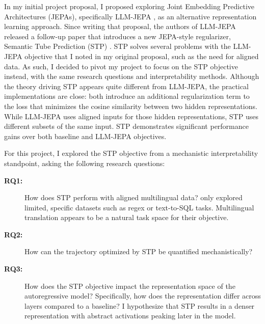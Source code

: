 \documentclass[11pt]{article}
\begin{document}
In my initial project proposal, I proposed exploring Joint Embedding Predictive Architectures (JEPAs), specifically LLM-JEPA \cite{huang2026llmjepa}, as an alternative representation learning approach. Since writing that proposal, the authors of LLM-JEPA released a follow-up paper that introduces a new JEPA-style regularizer, Semantic Tube Prediction (STP) \cite{stp}. STP solves several problems with the LLM-JEPA objective that I noted in my original proposal, such as the need for aligned data. As such, I decided to pivot my project to focus on the STP objective instead, with the same research questions and interpretability methods. Although the theory driving STP appears quite different from LLM-JEPA, the practical implementations are close: both introduce an additional regularization term to the loss that minimizes the cosine similarity between two hidden representations. While LLM-JEPA uses aligned inputs for those hidden representations, STP uses different subsets of the same input. STP demonstrates significant performance gains over both baseline and LLM-JEPA objectives.



For this project, I explored the STP objective from a mechanistic interpretability standpoint, asking the following research questions:

\begin{description}
  \item[\textbf{RQ1:}] How does STP perform with aligned multilingual data? \citet{stp} only explored limited, specific datasets such as regex or text-to-SQL tasks. Multilingual translation appears to be a natural task space for their objective.
  \item[\textbf{RQ2:}] How can the trajectory optimized by STP be quantified mechanistically? 
  \item[\textbf{RQ3:}] How does the STP objective impact the representation space of the autoregressive model? Specifically, how does the representation differ across layers compared to a baseline? I hypothesize that STP results in a denser representation with abstract activations peaking later in the model.
\end{description}
\end{document}
